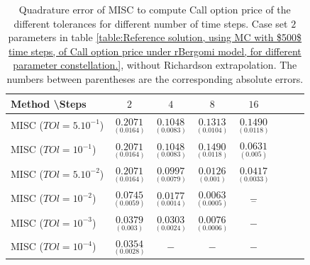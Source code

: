 \documentclass[11pt]{article}
\begin{document}
\begin{table}[h!]
	\centering
	\begin{tabular}{l*{6}{c}r}
		Method \textbackslash  Steps            & $2$ & $4$ & $8$ & $16$  \\
		\hline
		MISC ($TOl=5.10^{-1}$)  & $\underset{(0.0164)}{\mathbf{0.2071}}$ & $\underset{(0.0083)}{\mathbf{0.1048}}$ & $\underset{(0.0104)}{\mathbf{0.1313}}$ & $\underset{(0.0118)}{\mathbf{0.1490}}$  \\
		MISC ($TOl=10^{-1}$)  & $\underset{(0.0164)}{\mathbf{0.2071}}$ & $\underset{(0.0083)}{\mathbf{0.1048}}$ & $\underset{(0.0118)}{\mathbf{0.1490}}$ & $\underset{(0.005)}{\mathbf{0.0631}}$  \\
			MISC ($TOl=5.10^{-2}$)  &$\underset{(0.0164)}{\mathbf{0.2071}}$ & $\underset{(0.0079)}{\mathbf{0.0997}}$ & $\underset{(0.001)}{\mathbf{0.0126}}$ & $\underset{(0.0033)}{\mathbf{0.0417}}$  \\
	MISC ($TOl=10^{-2}$)  & $\underset{(0.0059)}{\mathbf{0.0745}}$ & $\underset{(0.0014)}{\mathbf{0.0177}}$ & $\underset{(0.0005)}{\mathbf{0.0063}}$ & $\underset{-}{\mathbf{-}}$  \\
		MISC ($TOl=10^{-3}$)        & $\underset{(0.003)}{\mathbf{0.0379}}$  &$\underset{(0.0024)}{\mathbf{0.0303}}$  &  $\underset{(0.0006)}{\mathbf{0.0076}}$ &  $-$ \\
	MISC ($TOl=10^{-4}$)        & $\underset{(0.0028)}{\mathbf{0.0354}} $ &$-$ &  $-$ &  $-$ \\	
		
		\hline
	\end{tabular}
	\caption{Quadrature error of MISC to compute Call option price of the different tolerances for different number of time steps. Case  set $2$ parameters in table \ref{table:Reference solution, using MC with $500$ time steps, of Call option price under rBergomi model, for different parameter constellation.}, without Richardson extrapolation. The numbers between parentheses are the corresponding absolute errors.}
	\label{Quadrature error of MISC to compute Call option price of the different tolerances for different number of time steps. Case  set $2$ parameters, without Richardson extrapolation. The numbers between parentheses are the corresponding absolute errors.}
\end{table}
\end{document}
